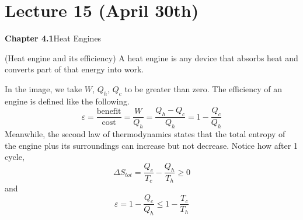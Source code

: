\section{Lecture 15 (April 30th)}
{\bf Chapter 4.1}\hspace{2ex}Heat Engines
\\
\begin{defi}
(Heat engine and its efficiency) A heat engine is any device that absorbs heat and converts part of that energy into work.
\begin{center}
\vspace{2ex}
\vspace{2ex}
\end{center}
In the image, we take $W$, $Q_{h}$, $Q_{c}$ to be greater than zero. The efficiency of an engine is defined like the following.
\[\varepsilon =\dfrac{\mathrm{benefit}}{\mathrm{cost}}=\dfrac{W}{Q_{h}}=\dfrac{Q_{h}-Q_{c}}{Q_{h}}=1-\dfrac{Q_{c}}{Q_{h}}\]
Meanwhile, the second law of thermodynamics states that the total entropy of the engine plus its surroundings can increase but not decrease. Notice how after 1 cycle, 
\[\Delta S_{tot}=\dfrac{Q_{c}}{T_{c}}-\dfrac{Q_{h}}{T_{h}}\geq 0\]
and
\[\varepsilon =1-\dfrac{Q_{c}}{Q_{h}}\leq 1-\dfrac{T_{c}}{T_{h}}\]
\end{defi}
\vspace{2ex}
